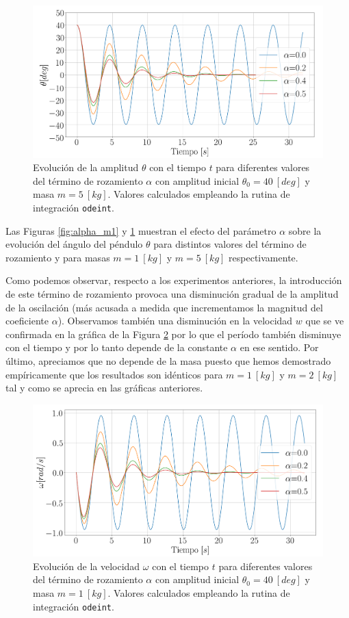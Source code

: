 \documentclass[journal]{IEEEtran}
\begin{document}
\begin{figure}[!htb]
  \centering
  \includegraphics[width=\linewidth]{alpha_m5}
  \caption{Evolución de la amplitud $\theta$ con el tiempo $t$ para diferentes valores del término de rozamiento $\alpha$ con amplitud inicial $\theta_0=40~[deg]$ y masa $m=5~[kg]$. Valores calculados empleando la rutina de integración \texttt{odeint}.}
  \label{fig:alpha_m2}
\end{figure}

Las Figuras \ref{fig:alpha_m1} y \ref{fig:alpha_m2} muestran el efecto del parámetro $\alpha$ sobre la evolución del ángulo del péndulo $\theta$ para distintos valores del término de rozamiento y para masas $m=1~[kg]$ y $m=5~[kg]$ respectivamente.

Como podemos observar, respecto a los experimentos anteriores, la introducción de este término de rozamiento provoca una disminución gradual de la amplitud de la oscilación (más acusada a medida que incrementamos la magnitud del coeficiente $\alpha$). Observamos también una disminución en la velocidad $w$ que se ve confirmada en la gráfica de la Figura \ref{fig:alpha_omega} por lo que el período también disminuye con el tiempo y por lo tanto depende de la constante $\alpha$ en
ese sentido. Por último, apreciamos que no depende de la masa puesto que hemos demostrado empíricamente que los resultados son idénticos para $m=1~[kg]$ y $m=2~[kg]$ tal y como se aprecia en las gráficas anteriores.

\begin{figure}[!htb]
  \centering
  \includegraphics[width=\linewidth]{alpha_omega}
  \caption{Evolución de la velocidad $\omega$ con el tiempo $t$ para diferentes valores del término de rozamiento $\alpha$ con amplitud inicial $\theta_0=40~[deg]$ y masa $m=1~[kg]$. Valores calculados empleando la rutina de integración \texttt{odeint}.}
  \label{fig:alpha_omega}
\end{figure}
\end{document}
